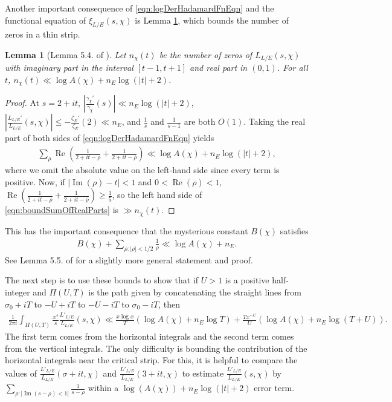 \documentclass[12pt]{amsart}
\newtheorem{lem}[thm]{Lemma}
\theoremstyle{definition}
\theoremstyle{remark}
\numberwithin{equation}{section}
\DeclareMathOperator{\re}{Re}
\DeclareMathOperator{\im}{Im}
\begin{document}
Another important consequence of \eqref{eqn:logDerHadamardFnEqn} and the functional equation of $\xi_{L/E}(s,\chi)$ is Lemma \ref{lem:NumZerosInStrip}, which bounds the number of zeros in a thin strip.

\begin{lem}[Lemma 5.4. of \cite{LagariasOdlyzko77}] \label{lem:NumZerosInStrip} 
Let $n_{\chi}(t)$ be the number of zeros of $L_{L/E}(s, \chi)$ with imaginary part in the interval $[t-1,t+1]$ and real part in $(0,1)$.  For all $t$, $n_{\chi}(t) \ll \log A(\chi) + n_{E} \log (|t| + 2)$.
\end{lem}
\begin{proof}
At $s = 2 + it$,  $\left|\frac{\gamma_{\chi}'}{\gamma_\chi}(s)\right| \ll n_{E} \log(|t| + 2)$,  $\left|\frac{L_{L/E}'}{L_{L/E}}(s, \chi)\right|\leq -\frac{\zeta_{E}'}{\zeta_{E}}(2) \ll n_{E}$, and $\frac{1}{s}$ and $\frac{1}{s-1}$ are both $O(1)$. Taking the real part of both sides of \eqref{eqn:logDerHadamardFnEqn} yields 
\begin{align} \label{eqn:boundSumOfRealParts}
\sum_{\rho} \re\left(\frac{1}{2 + it -\rho} + \frac{1}{2 + it - \overline{\rho}}\right) \ll \log A(\chi) + n_{E}\log(|t| + 2),
\end{align}
where we omit the absolute value on the left-hand side since every term is positive.
Now, if $|\im(\rho) - t| < 1$ and $0 < \re(\rho) < 1$,  $\re\left(\frac{1}{2 + it -\rho} + \frac{1}{2 + it - \overline{\rho}}\right) \geq \frac{1}{5}$, so the left hand side of \eqref{eqn:boundSumOfRealParts} is $\gg n_{\chi}(t)$.
\end{proof}
This has the important consequence that the mysterious constant $B(\chi)$ satisfies 
\begin{align} \label{eqn:EstimateBChi}
B(\chi) + \sum_{\rho: |\rho| < 1/2} \frac{1}{\rho} \ll \log A(\chi) + n_{E}.
\end{align}
See Lemma 5.5. of \cite{LagariasOdlyzko77} for a slightly more general statement and proof.

The next step is to use these bounds to show that if $U> 1$ is a positive half-integer and $\Pi(U,T)$ is the path given by concatenating the straight lines from $\sigma_{0} + iT$ to $-U + iT$ to $-U - iT$ to $\sigma_{0} - iT$, then
\begin{align} \label{eqn:Bound the rest}
\frac{1}{2\pi i}\int_{\Pi(U,T)} \frac{x^{s}}{s} \frac{L'_{L/E}}{L_{L/E}}(s,\chi) \ll \frac{x\log x}{T}(\log A(\chi) + n_{E}\log T)+ \frac{Tx^{-U}}{U}(\log A(\chi) + n_{E} \log(T +U)).
\end{align}
The first term comes from the horizontal integrals and the second term comes from the vertical integrals. The only difficulty is bounding the contribution of the horizontal integrals near the critical strip. For this, it is helpful to compare the values of $\frac{L'_{L/E}}{L_{L/E}}(\sigma + it, \chi)$ and $\frac{L'_{L/E}}{L_{L/E}}(3 + it, \chi)$ to estimate $\frac{L'_{L/E}}{L_{L/E}}(s,\chi)$ by $\sum_{\rho: |\im(s - \rho) < 1|}\frac{1}{s - \rho}$ within a $\log(A(\chi)) + n_{E} \log(|t| + 2)$ error term.
\end{document}
